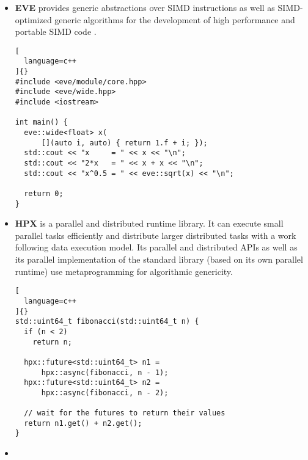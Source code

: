 \documentclass[../main]{subfiles}
\begin{document}
\begin{itemize}
\begin{lstlisting}[
  language=c++
]{}
#include <nt2/include/functions/ones.hpp>
#include <nt2/table.hpp>

using namespace nt2;

int main() {
  table<double> x;
  table<double> y = ones(4, 4);

  x = 40.0 * y + 2.0;

  NT2_DISPLAY(x);

  return 0;
}
\end{lstlisting}

  \item

\textbf{EVE} \cite{eve} provides generic abstractions over SIMD instructions
as well as SIMD-optimized generic algorithms for the development of
high performance and portable SIMD code \cite{hpcs2018-matvec}.

\begin{lstlisting}[
  language=c++
]{}
#include <eve/module/core.hpp>
#include <eve/wide.hpp>
#include <iostream>

int main() {
  eve::wide<float> x(
      [](auto i, auto) { return 1.f + i; });
  std::cout << "x     = " << x << "\n";
  std::cout << "2*x   = " << x + x << "\n";
  std::cout << "x^0.5 = " << eve::sqrt(x) << "\n";

  return 0;
}
\end{lstlisting}

  \item

\textbf{HPX} \cite{hpx} is a \cpp parallel and distributed runtime library.
It can execute small parallel tasks efficiently and distribute
larger distributed tasks with a work following data execution model.
Its parallel and distributed APIs as well as its parallel implementation of
the standard library (based on its own parallel runtime) use metaprogramming
for algorithmic genericity.

\begin{lstlisting}[
  language=c++
]{}
std::uint64_t fibonacci(std::uint64_t n) {
  if (n < 2)
    return n;

  hpx::future<std::uint64_t> n1 =
      hpx::async(fibonacci, n - 1);
  hpx::future<std::uint64_t> n2 =
      hpx::async(fibonacci, n - 2);

  // wait for the futures to return their values
  return n1.get() + n2.get();
}
\end{lstlisting}

  \item


\end{itemize}
\end{document}
